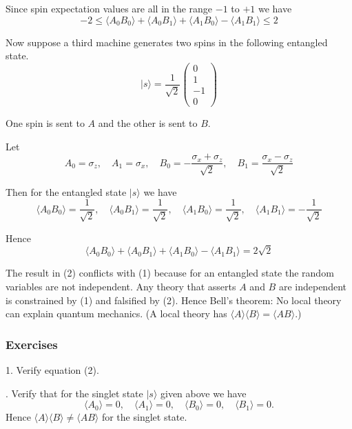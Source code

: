 Since spin expectation values are all in the range $-1$ to $+1$ we have
\begin{equation*}
-2\le \langle A_0B_0\rangle+\langle A_0B_1\rangle+\langle A_1B_0\rangle-\langle A_1B_1\rangle\le2
\tag{1}
\end{equation*}

Now suppose a third machine generates two spins in the following entangled state.
\begin{equation*}
|s\rangle=\frac{1}{\sqrt2}\begin{pmatrix}0\\1\\-1\\0\end{pmatrix}
\end{equation*}

One spin is sent to $A$ and the other is sent to $B$.

\bigskip
Let
\begin{equation*}
A_0=\sigma_z,\quad
A_1=\sigma_x,\quad
B_0=-\frac{\sigma_x+\sigma_z}{\sqrt2},\quad
B_1=\frac{\sigma_x-\sigma_z}{\sqrt2}
\end{equation*}

Then for the entangled state $|s\rangle$ we have
\begin{equation*}
\langle A_0B_0\rangle=\frac{1}{\sqrt2},\quad
\langle A_0B_1\rangle=\frac{1}{\sqrt2},\quad
\langle A_1B_0\rangle=\frac{1}{\sqrt2},\quad
\langle A_1B_1\rangle=-\frac{1}{\sqrt2}
\end{equation*}

Hence
\begin{equation*}
\langle A_0B_0\rangle+
\langle A_0B_1\rangle+
\langle A_1B_0\rangle-
\langle A_1B_1\rangle=2\sqrt2
\tag{2}
\end{equation*}

The result in (2) conflicts with (1) because for an entangled state
the random variables are not independent.
Any theory that asserts $A$ and $B$ are independent
is constrained by (1) and falsified by (2).
Hence Bell's theorem: No local theory can explain quantum mechanics.
(A local theory has $\langle A\rangle\langle B\rangle=\langle AB\rangle$.)

\subsubsection*{Exercises}

1. Verify equation (2).

. Verify that for the singlet state $|s\rangle$ given above we have
\begin{equation*}
\langle A_0\rangle=0,\quad\langle A_1\rangle=0,\quad\langle B_0\rangle=0,\quad\langle B_1\rangle=0.
\end{equation*}
Hence $\langle A\rangle\langle B\rangle\ne\langle AB\rangle$ for the singlet state.

